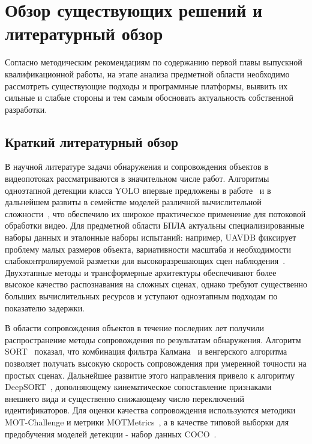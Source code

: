 \section{Обзор существующих решений и литературный обзор}
\label{sec:related_work}

Согласно методическим рекомендациям по содержанию первой главы выпускной квалификационной работы, на этапе анализа предметной области необходимо рассмотреть существующие подходы и программные платформы, выявить их сильные и слабые стороны и тем самым обосновать актуальность собственной разработки.

\subsection{Краткий литературный обзор}

В научной литературе задачи обнаружения и сопровождения объектов в видеопотоках рассматриваются в значительном числе работ. Алгоритмы одноэтапной детекции класса YOLO впервые предложены в работе~\cite{redmon2016yolo} и в дальнейшем развиты в семействе моделей различной вычислительной сложности~\cite{redmon2018yolov3,ultralytics_docs}, что обеспечило их широкое практическое применение для потоковой обработки видео. Для предметной области БПЛА актуальны специализированные наборы данных и эталонные наборы испытаний: например, UAVDB фиксирует проблему малых размеров объекта, вариативности масштаба и необходимости слабоконтролируемой разметки для высокоразрешающих сцен наблюдения~\cite{chen2026uavdb}. Двухэтапные методы и трансформерные архитектуры обеспечивают более высокое качество распознавания на сложных сценах, однако требуют существенно больших вычислительных ресурсов и уступают одноэтапным подходам по показателю задержки.

В области сопровождения объектов в течение последних лет получили распространение методы сопровождения по результатам обнаружения. Алгоритм SORT~\cite{bewley2016sort} показал, что комбинация фильтра Калмана~\cite{kalman1960} и венгерского алгоритма~\cite{kuhn1955hungarian} позволяет получать высокую скорость сопровождения при умеренной точности на простых сценах. Дальнейшее развитие этого направления привело к алгоритму DeepSORT~\cite{wojke2017deepsort}, дополняющему кинематическое сопоставление признаками внешнего вида и существенно снижающему число переключений идентификаторов. Для оценки качества сопровождения используются методики MOT-Challenge и метрики MOTMetrics~\cite{bernardin2008motmetrics,motchallenge}, а в качестве типовой выборки для предобучения моделей детекции - набор данных COCO~\cite{coco_dataset}.

